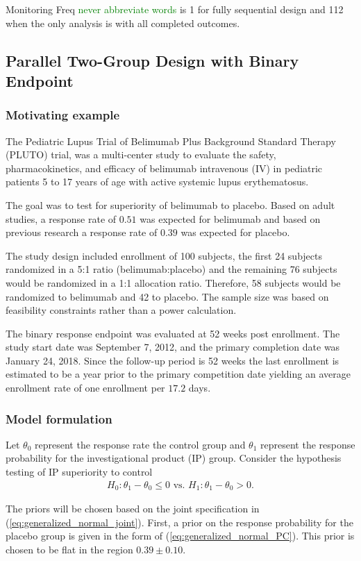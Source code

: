 \documentclass[12pt]{article}
\begin{document}
Monitoring Freq \textcolor{green}{never abbreviate words} is 1 for fully sequential design and 112 when the only analysis is with all completed outcomes.
\subsection{Parallel Two-Group Design with Binary Endpoint}
\subsubsection{Motivating example}
The Pediatric Lupus Trial of Belimumab Plus Background Standard Therapy (PLUTO) trial, was a multi-center study to evaluate the safety, pharmacokinetics, and efficacy of belimumab intravenous (IV) in pediatric patients 5 to 17 years of age with active systemic lupus erythematosus. 

The goal was to test for superiority of belimumab to placebo. Based on adult studies, a response rate of $0.51$ was expected for belimumab and based on previous research a response rate of $0.39$ was expected for placebo.

The study design included enrollment of 100 subjects, the first 24 subjects randomized in a 5:1 ratio (belimumab:placebo) and the remaining 76 subjects would be randomized in a 1:1 allocation ratio. Therefore, 58 subjects would be randomized to belimumab and 42 to placebo. The sample size was based on feasibility constraints rather than a power calculation.

The binary response endpoint was evaluated at 52 weeks post enrollment. The study start date was September 7, 2012, and the primary completion date was January 24, 2018. Since the follow-up period is 52 weeks the last enrollment is estimated to be a year prior to the primary competition date yielding an average enrollment rate of one enrollment per $17.2$ days.
\subsubsection{Model formulation}
Let $\theta_0$ represent the response rate the control group and $\theta_1$ represent the response probability for the investigational product (IP) group. 
Consider the hypothesis testing of IP superiority to control
\begin{align*}
H_0:\theta_1-\theta_0\leq 0\text{ vs. }H_1: \theta_1-\theta_0>0.
\end{align*}

The priors will be chosen based on the joint specification in (\ref{eq:generalized_normal_joint}). First, a prior on the response probability for the placebo group is given in the form of (\ref{eq:generalized_normal_PC}). This prior is chosen to be flat in the region $0.39\pm 0.10$.
\end{document}
